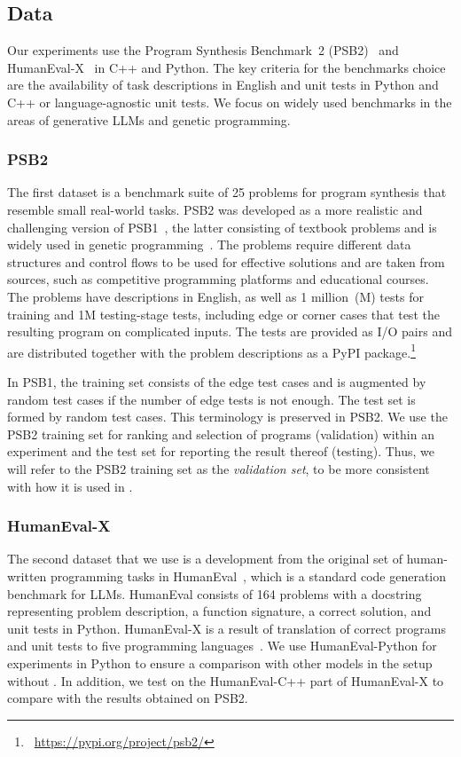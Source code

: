 \subsection{Data}
\label{sec:seidr-data}

Our experiments use the Program Synthesis Benchmark~2 (PSB2)~\cite{helmuth2022:applying} and HumanEval-X~\cite{zheng2023:codegeex} in C++ and Python. 
The key criteria for the benchmarks choice are the availability of task descriptions in English and unit tests in Python and C++ or language-agnostic unit tests. 
We focus on widely used benchmarks in the areas of generative LLMs and genetic programming. 

\subsubsection{PSB2}
The first dataset is a benchmark suite of 25 problems for program synthesis that resemble small real-world tasks. PSB2 was developed as a more realistic and challenging version of PSB1~\cite{helmuth2015:general}, the latter consisting of textbook problems and is widely used in genetic programming~\cite{sobania2022:choose}. 
The problems require different data structures and control flows to be used for effective solutions and are taken from sources, such as competitive programming platforms and educational courses. 
The problems have descriptions in English, as well as 1 million~(M) tests for training and 1M testing-stage tests, including edge or corner cases that test the resulting program on complicated inputs. 
The tests are provided as I/O pairs and are distributed together with the problem descriptions as a PyPI package.\footnote{~\url{https://pypi.org/project/psb2/}} 

In PSB1, the training set consists of the edge test cases and is augmented by random test cases if the number of edge tests is not enough. The test set is formed by random test cases. 
This terminology is preserved in PSB2.
We use the PSB2 training set for ranking and selection of programs (validation) within an experiment and the test set for reporting the result thereof (testing).
Thus, we will refer to the PSB2 training set as the \emph{validation set}, to be more consistent with how it is used in \method{}.

\subsubsection{HumanEval-X}
The second dataset that we use is a development from the original set of human-written programming tasks in HumanEval~\cite{chen2021:evaluating}, which is a standard code generation benchmark for LLMs.
HumanEval consists of 164 problems with a docstring representing problem description, a function signature, a correct solution, and unit tests in Python. 
HumanEval-X is a result of translation of correct programs and unit tests to five programming languages~\cite{zheng2023:codegeex}. 
We use HumanEval-Python for experiments in Python to ensure a comparison with other models in the setup without \method{}. 
In addition, we test \method{} on the HumanEval-C++ part of HumanEval-X to compare with the results obtained on PSB2. %

